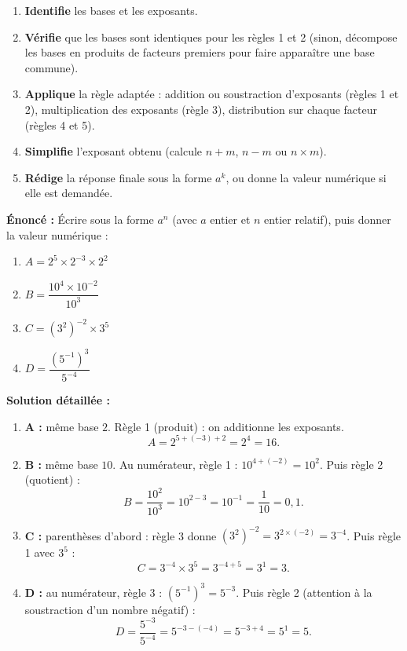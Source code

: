 \documentclass[11pt]{article}
\begin{document}
\begin{methode}
\begin{enumerate}
    \item \textbf{Identifie} les bases et les exposants.
    \item \textbf{Vérifie} que les bases sont identiques pour les règles 1 et 2 (sinon, décompose les bases en produits de facteurs premiers pour faire apparaître une base commune).
    \item \textbf{Applique} la règle adaptée : addition ou soustraction d'exposants (règles 1 et 2), multiplication des exposants (règle 3), distribution sur chaque facteur (règles 4 et 5).
    \item \textbf{Simplifie} l'exposant obtenu (calcule $n+m$, $n-m$ ou $n \times m$).
    \item \textbf{Rédige} la réponse finale sous la forme $a^k$, ou donne la valeur numérique si elle est demandée.
\end{enumerate}
\end{methode}

\begin{exoresolu}
\textbf{Énoncé :} Écrire sous la forme $a^n$ (avec $a$ entier et $n$ entier relatif), puis donner la valeur numérique :
\begin{enumerate}
    \item $A = 2^5 \times 2^{-3} \times 2^2$
    \item $B = \dfrac{10^4 \times 10^{-2}}{10^3}$
    \item $C = (3^2)^{-2} \times 3^5$
    \item $D = \dfrac{(5^{-1})^3}{5^{-4}}$
\end{enumerate}
\tcblower
\textbf{Solution détaillée :}
\begin{enumerate}
    \item \textbf{A :} même base $2$. Règle 1 (produit) : on additionne les exposants.
    \[ A = 2^{5 + (-3) + 2} = 2^{4} = 16. \]
    \item \textbf{B :} même base $10$. Au numérateur, règle 1 : $10^{4+(-2)} = 10^2$. Puis règle 2 (quotient) :
    \[ B = \dfrac{10^2}{10^3} = 10^{2-3} = 10^{-1} = \dfrac{1}{10} = 0,1. \]
    \item \textbf{C :} parenthèses d'abord : règle 3 donne $(3^2)^{-2} = 3^{2 \times (-2)} = 3^{-4}$. Puis règle 1 avec $3^5$ :
    \[ C = 3^{-4} \times 3^5 = 3^{-4+5} = 3^{1} = 3. \]
    \item \textbf{D :} au numérateur, règle 3 : $(5^{-1})^3 = 5^{-3}$. Puis règle 2 (attention à la soustraction d'un nombre négatif) :
    \[ D = \dfrac{5^{-3}}{5^{-4}} = 5^{-3 - (-4)} = 5^{-3+4} = 5^{1} = 5. \]
\end{enumerate}
\end{exoresolu}
\end{document}
